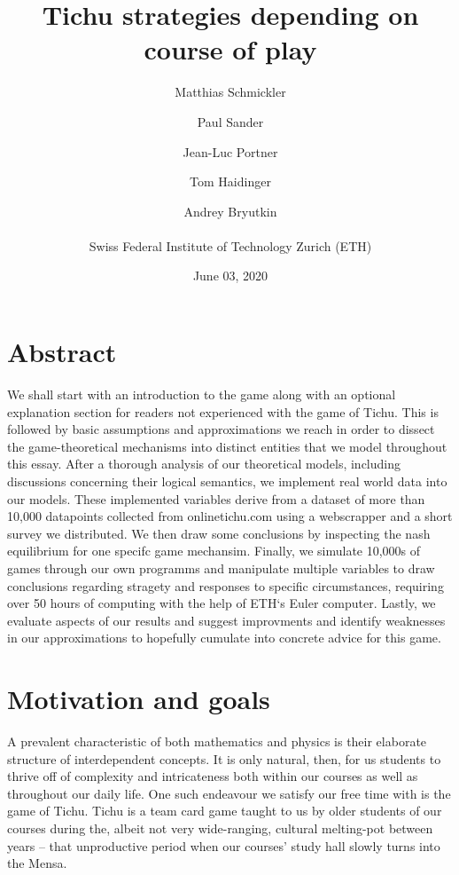 


\usepackage{multirow}
\usepackage{listings}
\usepackage{commath}


\title{Tichu strategies depending on course of play}
\date{June 03, 2020}
\author{Matthias Schmickler \and Paul Sander \and Jean-Luc Portner \and Tom Haidinger \and Andrey Bryutkin \\ \\ Swiss Federal Institute of Technology Zurich (ETH)}
\maketitle

\section*{Abstract}
We shall start with an introduction to the game along with an optional explanation section for readers not experienced with the game of Tichu. This is followed by basic assumptions and approximations we reach in order to dissect the game-theoretical mechanisms into distinct entities that we model throughout this essay. After a thorough analysis of our theoretical models, including discussions concerning their logical semantics, we implement real world data into our models. These implemented variables derive from a dataset of more than 10,000 datapoints collected from onlinetichu.com using a webscrapper and a short survey we distributed. We then draw some conclusions by inspecting the nash equilibrium for one specifc game mechansim. Finally, we simulate 10,000s of games through our own programms and manipulate multiple variables to draw conclusions regarding stragety and responses to specific circumstances, requiring over 50 hours of computing with the help of ETH‘s Euler computer. Lastly, we evaluate aspects of our results and suggest improvments and identify weaknesses in our approximations to hopefully cumulate into concrete advice for this game.

\section{Motivation and goals}

A prevalent characteristic of both mathematics and physics is their elaborate structure of interdependent concepts. It is only natural, then, for us students to thrive off of complexity and intricateness both within our courses as well as throughout our daily life. One such endeavour we satisfy our free time with is the game of Tichu. Tichu is a team card game taught to us by older students of our courses during the, albeit not very wide-ranging, cultural melting-pot between years – that unproductive period when our courses’ study hall slowly turns into the Mensa. 

